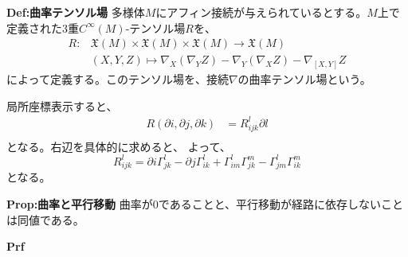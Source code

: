 \documentclass[a4paper,11pt]{jsarticle}
\numberwithin{equation}{section}
\begin{document}
\begin{itembox}[l]{\textbf{Def:曲率テンソル場}}
    多様体$M$にアフィン接続が与えられているとする。$M$上で定義された3重$C^\infty(M)$-テンソル場$R$を、
    \begin{align}
        R : &\mathfrak{X}(M) \times \mathfrak{X}(M) \times \mathfrak{X}(M) \to \mathfrak{X}(M) \\
        & (X,Y,Z) \mapsto \nabla_X(\nabla_YZ) - \nabla_Y(\nabla_XZ) - \nabla_{[X,Y]}Z
    \end{align}
    によって定義する。このテンソル場を、接続$\nabla$の曲率テンソル場という。

\end{itembox}
局所座標表示すると、
\begin{align}
    R(\partial{i},\partial{j},\partial{k}) &= R_{ijk}^l\partial{l}\\
\end{align}
となる。右辺を具体的に求めると、
よって、
\begin{equation}
    R_{ijk}^l = \partial{i}\Gamma_{jk}^l - \partial{j}\Gamma_{ik}^l + \Gamma_{im}^l\Gamma_{jk}^m - \Gamma_{jm}^l\Gamma_{ik}^m
\end{equation}
となる。

\begin{itembox}[l]{\textbf{Prop:曲率と平行移動}}
    曲率が0であることと、平行移動が経路に依存しないことは同値である。
\end{itembox}
\textbf{Prf}\\
\end{document}

